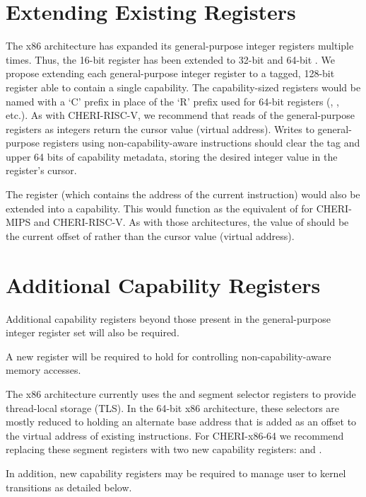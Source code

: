 \section{Extending Existing Registers}

The x86 architecture has expanded its general-purpose integer registers multiple
times.  Thus, the 16-bit \AX{} register has been extended to 32-bit \EAX{}
and 64-bit \RAX{}.
We propose extending each general-purpose integer register to a tagged, 128-bit register
able to contain a single capability.
The capability-sized registers would be named with a `C' prefix in place
of the `R' prefix used for 64-bit registers
(\CAX{}, \CBX{}, etc.).
As with CHERI-RISC-V,
we recommend that reads of the general-purpose registers as integers return
the cursor value (virtual address).
Writes to general-purpose registers using non-capability-aware instructions
should clear the tag and upper 64 bits of capability metadata, storing the
desired integer value in the register's cursor.

The \RIP{} register (which contains the address of the current instruction)
would also be extended into a \CIP{} capability.  This would function as
the equivalent of \PCC{} for CHERI-MIPS and CHERI-RISC-V.  As with
those architectures, the
value of \RIP{} should be the current offset of \CIP{} rather than the
cursor value (virtual address).

\section{Additional Capability Registers}

Additional capability registers beyond those present in the general-purpose
integer
register set will also be required.

A new register will be required to hold \DDC{} for controlling
non-capability-aware memory accesses.

The x86 architecture currently uses the \FS{} and \GS{} segment selector registers
to provide thread-local storage (TLS).  In the 64-bit x86 architecture,
these selectors are mostly reduced to holding an alternate base address
that is added as an offset to the virtual address of existing instructions.
For CHERI-x86-64 we recommend replacing these segment registers with two
new capability registers: \CFS{} and \CGS{}.

In addition, new capability registers may be required to manage user
to kernel transitions as detailed below.

